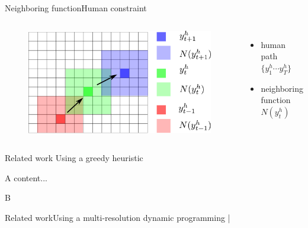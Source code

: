 \begin{frame}{Neighboring function}{Human constraint}
	\begin{columns}
		\begin{minipage}[c]{\linewidth}
			\begin{figure}
				\centering
				\includegraphics[width = \textwidth]{./figure/humanConstraint}
			\end{figure}
		\end{minipage}
		
		\begin{minipage}[c]{\linewidth}
			\begin{itemize}
				\item { human path $ \{ y^{h}_{1} \cdots y^{h}_{T} \} $ }
				\item { neighboring function $ N( y^{h}_{t} ) $ }
			\end{itemize}
		\end{minipage}
	\end{columns}
	
\end{frame}

\begin{frame}{Related work}{ Using a greedy heuristic}
\begin{block}{A}
	content...
\end{block}
\begin{block}{B}
\end{block}
\end{frame}

\begin{frame}{Related work}{Using a multi-resolution dynamic programming}
	|
\end{frame}




